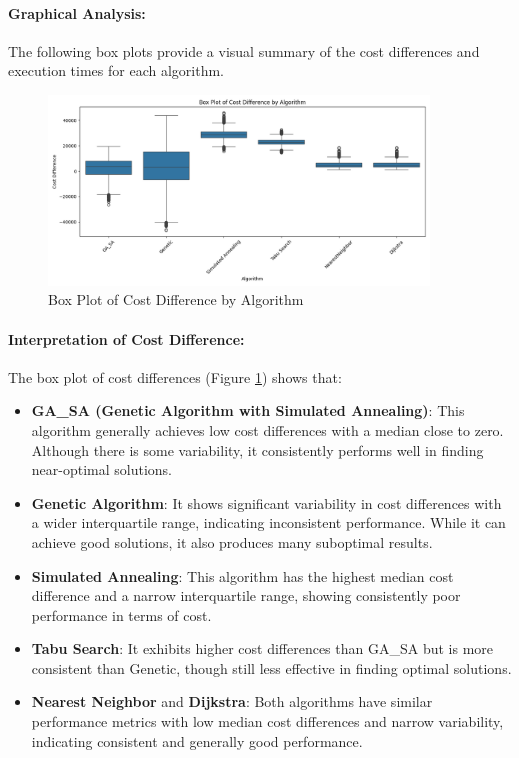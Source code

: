 \documentclass{article}
\begin{document}
    \paragraph{Graphical Analysis:}
    The following box plots provide a visual summary of the cost differences and execution times for each algorithm.

    \begin{figure}[h!]
        \centering
        \includegraphics[width=0.9\textwidth]{algo_summary/boxplot_cost_difference}
        \caption{Box Plot of Cost Difference by Algorithm}
        \label{fig:boxplot_cost_difference}
    \end{figure}

    \paragraph{Interpretation of Cost Difference:}
    The box plot of cost differences (Figure \ref{fig:boxplot_cost_difference}) shows that:
    \begin{itemize}
        \item \textbf{GA\_SA (Genetic Algorithm with Simulated Annealing)}: This algorithm generally achieves low cost differences with a median close to zero. Although there is some variability, it consistently performs well in finding near-optimal solutions.
        \item \textbf{Genetic Algorithm}: It shows significant variability in cost differences with a wider interquartile range, indicating inconsistent performance. While it can achieve good solutions, it also produces many suboptimal results.
        \item \textbf{Simulated Annealing}: This algorithm has the highest median cost difference and a narrow interquartile range, showing consistently poor performance in terms of cost.
        \item \textbf{Tabu Search}: It exhibits higher cost differences than GA\_SA but is more consistent than Genetic, though still less effective in finding optimal solutions.
        \item \textbf{Nearest Neighbor} and \textbf{Dijkstra}: Both algorithms have similar performance metrics with low median cost differences and narrow variability, indicating consistent and generally good performance.
    \end{itemize}
\end{document}
